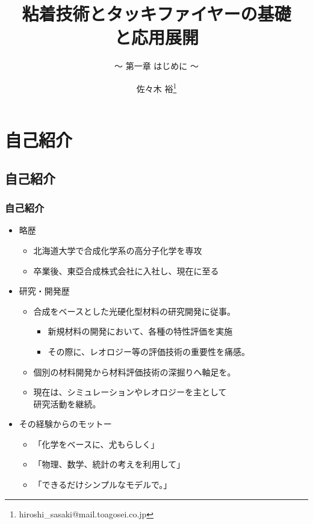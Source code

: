\documentclass[unicode,12pt]{beamer}%
\title{粘着技術とタッキファイヤーの基礎\\と応用展開}
\subtitle{ ～ 第一章 はじめに ～}
\author[東亞合成 佐々木]{佐々木 裕\thanks{hiroshi\_sasaki@mail.toagosei.co.jp}}
\institute[東亞合成]{東亞合成株式会社}
\date{}
\begin{document}
\maketitle

\begin{frame} 
    \tableofcontents[]
\end{frame} 


\section{自己紹介}
\subsection{自己紹介}
\begin{frame}
	\frametitle{自己紹介}
	\begin{itemize}
		\item 略歴
			\begin{itemize}
				\item 北海道大学で合成化学系の高分子化学を専攻
				\item 卒業後、東亞合成株式会社に入社し、現在に至る
			\end{itemize}
		\item  研究・開発歴
			\begin{itemize}
				\item 合成をベースとした光硬化型材料の研究開発に従事。
				\begin{itemize}
					\item 新規材料の開発において、各種の特性評価を実施
					\item その際に、レオロジー等の評価技術の重要性を痛感。
				\end{itemize}
				\item 個別の材料開発から材料評価技術の深掘りへ軸足を。
				\item 現在は、シミュレーションやレオロジーを主として\\研究活動を継続。
			\end{itemize}
		\item その経験からのモットー
			\begin{itemize}
				\item 「化学をベースに、尤もらしく」
				\item 「物理、数学、統計の考えを利用して」
				\item 「できるだけシンプルなモデルで。」
			\end{itemize}
	\end{itemize}
	
\end{frame}
\end{document}
